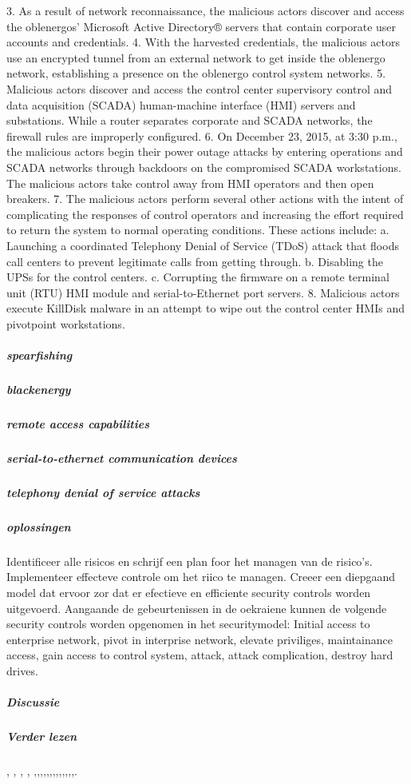 3. As a result of network reconnaissance, the malicious
actors discover and access the oblenergos’ Microsoft
Active Directory® servers that contain corporate user
accounts and credentials.
4. With the harvested credentials, the malicious actors use
an encrypted tunnel from an external network to get
inside the oblenergo network, establishing a presence
on the oblenergo control system networks.
5. Malicious actors discover and access the control center
supervisory control and data acquisition (SCADA)
human-machine interface (HMI) servers and
substations. While a router separates corporate and
SCADA networks, the firewall rules are improperly
configured.
6. On December 23, 2015, at 3:30 p.m., the malicious
actors begin their power outage attacks by entering
operations and SCADA networks through backdoors on
the compromised SCADA workstations. The malicious
actors take control away from HMI operators and then
open breakers.
7. The malicious actors perform several other actions with
the intent of complicating the responses of control
operators and increasing the effort required to return the
system to normal operating conditions. These actions
include:
a. Launching a coordinated Telephony Denial of
Service (TDoS) attack that floods call centers to
prevent legitimate calls from getting through.
b. Disabling the UPSs for the control centers.
c. Corrupting the firmware on a remote terminal unit
(RTU) HMI module and serial-to-Ethernet port
servers.
8. Malicious actors execute KillDisk malware in an
attempt to wipe out the control center HMIs and pivotpoint workstations.
\cite{Whitehead2017ukrainepoweroutage}
\cite{boozallen2016lightwentout}
\subparagraph{spearfishing}
\subparagraph{blackenergy}
\subparagraph{remote access capabilities}
\subparagraph{serial-to-ethernet communication devices}
\subparagraph{telephony denial of service attacks}
\subparagraph{oplossingen}
Identificeer alle risicos en schrijf een plan foor het managen van de risico's.
Implementeer  effecteve controle  om het riico te managen.
Creeer een diepgaand model dat ervoor zor dat er efectieve en efficiente security controls worden uitgevoerd.
Aangaande de gebeurtenissen in de oekraiene kunnen de volgende security controls worden opgenomen in het securitymodel: Initial access to enterprise network, pivot in interprise network, elevate priviliges, maintainance access, gain access to control system, attack, attack complication, destroy hard drives.
\cite{Whitehead2017ukrainepoweroutage}
\subparagraph{Discussie}
\subparagraph{Verder lezen}
\cite{shahzad2014ScadaProtocolsPollingScenario},
\cite{grammatikis2019AttackIEC6087505104},
\cite{2017win32industroyer},
\cite{yadav2020reviewScadaArchitecture},
\cite{arrizabalaga2020surveyiiotProtocols},\cite{fauri2017EncryptionICS},\cite{resch31102019IEC62351secureCommunication},\cite{levalle2020FuzzingICSProtocols},\cite{blackhatusa2017},\cite{blackhatusa2017},\cite{abb30062017crashoverridenotification},\cite{spinner2018crashoverrideiot},\cite{njccicthreat08102017crashovverrideprofile},\cite{slowikvb2018crashoverride},\cite{crashoverridenetwork},\cite{wikiindustroyer},\cite{icsSecurityRussianHacking},\cite{holappa2017threattoElectricityNetworks}.

